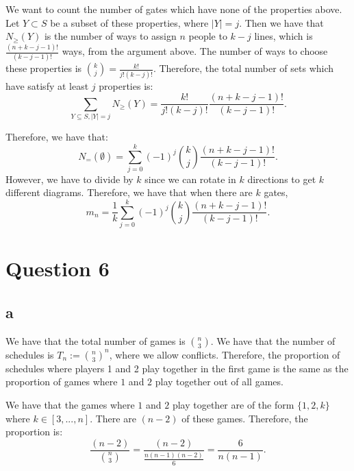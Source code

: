 \documentclass[]{article}
\theoremstyle{definition}
\numberwithin{theorem}{section}
\numberwithin{equation}{section}
\begin{document}
We want to count the number of gates which have none of the properties above. Let $Y \subset S$ be a subset of these properties, where $|Y| = j$. Then we have that $N_\geq(Y)$ is the number of ways to assign $n$ people to $k - j$ lines, which is $\frac{(n + k - j - 1)!}{(k - j - 1)!}$ ways, from the argument above. The number of ways to choose these properties is $\binom{k}{j} = \frac{k!}{j! (k - j)!}$. Therefore, the total number of sets which have satisfy at least $j$ properties is:
\begin{equation}
	\sum_{Y \subseteq S, |Y| = j} N_\geq(Y) = \frac{k!}{j! (k - j)!}\frac{(n + k - j - 1)!}{(k - j - 1)!}.
\end{equation}

Therefore, we have that:
\begin{equation}
	N_=(\emptyset) = \sum_{j = 0}^k (-1)^j \binom{k}{j}\frac{(n + k - j - 1)!}{(k - j - 1)!}.
\end{equation}
However, we have to divide by $k$ since we can rotate in $k$ directions to get $k$ different diagrams. Therefore, we have that when there are $k$ gates, 
\begin{equation}
	m_n = \frac{1}{k} \sum_{j = 0}^k (-1)^j \binom{k}{j}\frac{(n + k - j - 1)!}{(k - j - 1)!}.
\end{equation}

\section{Question 6}

\subsection{a}
We have that the total number of games is $\binom{n}{3}$. We have that the number of schedules is $T_n := \binom{n}{3}^n$, where we allow conflicts. Therefore, the proportion of schedules where players 1 and 2 play together in the first game is the same as the proportion of games where $1$ and $2$ play together out of all games. 

We have that the games where $1$ and $2$ play together are of the form $\{ 1, 2, k\}$ where $k \in [3, ..., n]$. There are $(n-2)$ of these games.
Therefore, the proportion is:
\begin{equation}
	\frac{(n-2)}{\binom{n}{3}} = \frac{(n-2)}{\frac{n(n-1)(n-2)}{6}} = \frac{6}{n(n-1)}.
\end{equation}
\end{document}
